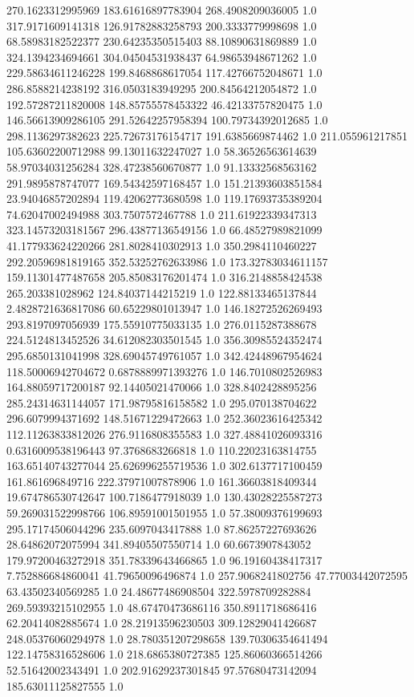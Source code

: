270.1623312995969	183.61616897783904	268.4908209036005	1.0
317.9171609141318	126.91782883258793	200.3333779998698	1.0
68.58983182522377	230.64235350515403	88.10890631869889	1.0
324.1394234694661	304.04504531938437	64.98653948671262	1.0
229.58634611246228	199.8468868617054	117.42766752048671	1.0
286.8588214238192	316.0503183949295	200.84564212054872	1.0
192.57287211820008	148.85755578453322	46.42133757820475	1.0
146.56613909286105	291.52642257958394	100.79734392012685	1.0
298.1136297382623	225.72673176154717	191.6385669874462	1.0
211.055961217851	105.63602200712988	99.13011632247027	1.0
58.36526563614639	58.97034031256284	328.47238560670877	1.0
91.13332568563162	291.9895878747077	169.54342597168457	1.0
151.21393603851584	23.94046857202894	119.42062773680598	1.0
119.17693735389204	74.62047002494988	303.7507572467788	1.0
211.61922339347313	323.14573203181567	296.43877136549156	1.0
66.48527989821099	41.177933624220266	281.8028410302913	1.0
350.2984110460227	292.20596981819165	352.53252762633986	1.0
173.32783034611157	159.11301477487658	205.85083176201474	1.0
316.2148858424538	265.203381028962	124.84037144215219	1.0
122.88133465137844	2.4828721636817086	60.65229801013947	1.0
146.18272526269493	293.8197097056939	175.55910775033135	1.0
276.0115287388678	224.5124813452526	34.612082303501545	1.0
356.30985524352474	295.6850131041998	328.69045749761057	1.0
342.42448967954624	118.50006942704672	0.6878889971393276	1.0
146.7010802526983	164.88059717200187	92.14405021470066	1.0
328.8402428895256	285.24314631144057	171.98795816158582	1.0
295.070138704622	296.6079994371692	148.51671229472663	1.0
252.36023616425342	112.11263833812026	276.9116808355583	1.0
327.48841026093316	0.6316009538196443	97.3768683266818	1.0
110.22023163814755	163.65140743277044	25.626996255719536	1.0
302.6137717100459	161.861696849716	222.37971007878906	1.0
161.36603818409344	19.674786530742647	100.7186477918039	1.0
130.43028225587273	59.269031522998766	106.89591001501955	1.0
57.38009376199693	295.17174506044296	235.6097043417888	1.0
87.86257227693626	28.64862072075994	341.89405507550714	1.0
60.6673907843052	179.97200463272918	351.78339643466865	1.0
96.19160438417317	7.752886684860041	41.79650096496874	1.0
257.9068241802756	47.77003442072595	63.43502340569285	1.0
24.48677486908504	322.5978709282884	269.59393215102955	1.0
48.67470473686116	350.8911718686416	62.20414082885674	1.0
28.21913596230503	309.12829041426687	248.05376060294978	1.0
28.780351207298658	139.70306354641494	122.14758316528606	1.0
218.6865380727385	125.86060366514266	52.51642002343491	1.0
202.91629237301845	97.57680473142094	185.63011125827555	1.0
